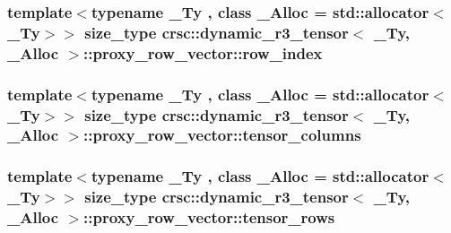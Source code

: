 \subsubsection[{\texorpdfstring{row\+\_\+index}{row_index}}]{\setlength{\rightskip}{0pt plus 5cm}template$<$typename \+\_\+\+Ty , class \+\_\+\+Alloc  = std\+::allocator$<$\+\_\+\+Ty$>$$>$ {\bf size\+\_\+type} {\bf crsc\+::dynamic\+\_\+r3\+\_\+tensor}$<$ \+\_\+\+Ty, \+\_\+\+Alloc $>$\+::proxy\+\_\+row\+\_\+vector\+::row\+\_\+index\hspace{0.3cm}{\ttfamily [private]}}\hypertarget{classcrsc_1_1dynamic__r3__tensor_1_1proxy__row__vector_a508eb3a7acbd9ddca465ba7ad2e34685}{}\label{classcrsc_1_1dynamic__r3__tensor_1_1proxy__row__vector_a508eb3a7acbd9ddca465ba7ad2e34685}
\subsubsection[{\texorpdfstring{tensor\+\_\+columns}{tensor_columns}}]{\setlength{\rightskip}{0pt plus 5cm}template$<$typename \+\_\+\+Ty , class \+\_\+\+Alloc  = std\+::allocator$<$\+\_\+\+Ty$>$$>$ {\bf size\+\_\+type} {\bf crsc\+::dynamic\+\_\+r3\+\_\+tensor}$<$ \+\_\+\+Ty, \+\_\+\+Alloc $>$\+::proxy\+\_\+row\+\_\+vector\+::tensor\+\_\+columns\hspace{0.3cm}{\ttfamily [private]}}\hypertarget{classcrsc_1_1dynamic__r3__tensor_1_1proxy__row__vector_a0ff8c44a0376eea59253906d46289e9f}{}\label{classcrsc_1_1dynamic__r3__tensor_1_1proxy__row__vector_a0ff8c44a0376eea59253906d46289e9f}
\subsubsection[{\texorpdfstring{tensor\+\_\+rows}{tensor_rows}}]{\setlength{\rightskip}{0pt plus 5cm}template$<$typename \+\_\+\+Ty , class \+\_\+\+Alloc  = std\+::allocator$<$\+\_\+\+Ty$>$$>$ {\bf size\+\_\+type} {\bf crsc\+::dynamic\+\_\+r3\+\_\+tensor}$<$ \+\_\+\+Ty, \+\_\+\+Alloc $>$\+::proxy\+\_\+row\+\_\+vector\+::tensor\+\_\+rows\hspace{0.3cm}{\ttfamily [private]}}\hypertarget{classcrsc_1_1dynamic__r3__tensor_1_1proxy__row__vector_a4bf508334382de7c48a7e5d8079adf4c}{}\label{classcrsc_1_1dynamic__r3__tensor_1_1proxy__row__vector_a4bf508334382de7c48a7e5d8079adf4c}
